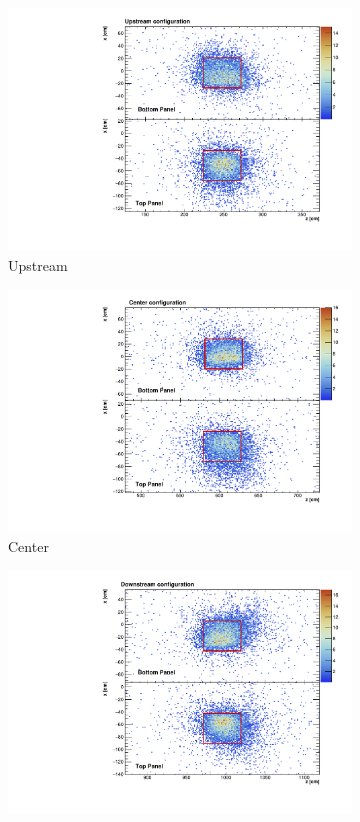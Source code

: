 \documentclass[a4paper]{scrartcl}
\begin{document}
\begin{figure}[htbp]
  \begin{subfigure}{0.32\textwidth}
    \includegraphics[width=\linewidth]{figures/upstream.pdf}
    \caption{Upstream} \label{fig:upstream_align}
  \end{subfigure}
  \begin{subfigure}{0.32\textwidth}
    \includegraphics[width=\linewidth]{figures/centre.pdf}
    \caption{Center} \label{fig:centre_align}
  \end{subfigure}
  \begin{subfigure}{0.32\textwidth}
    \includegraphics[width=\linewidth]{figures/downstream.pdf}

\end{subfigure}
\end{figure}
\end{document}
